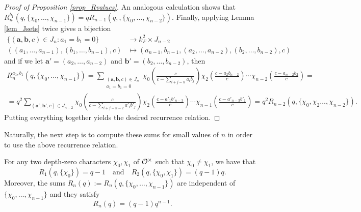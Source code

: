 \begin{proof}[Proof of Proposition \ref{prop_Rvalues}]
        An analogous calculation shows that $R_n^{b_1}(q,\{\chi_0,\ldots,\chi_{n-1}\})=qR_{n-1}(q,,\{\chi_0,\ldots,\chi_{n-2}\})$. Finally, applying Lemma \ref{lem_Jsets} twice gives a bijection 
        \begin{align*}
            \{(\mathbf{a},\mathbf{b},c)\in J_n:a_1=b_1=0\}&\longrightarrow k_F^2\times J_{n-2}\\
            ((a_1,\ldots,a_{n-1}),(b_1,\ldots,b_{n-1}),c)&\longmapsto (a_{n-1},b_{n-1},(a_2,\ldots,a_{n-2}),(b_2,\ldots,b_{n-2}),c)
        \end{align*}
        and if we let $\mathbf{a}'=(a_2,\ldots,a_{n-2})$ and $\mathbf{b}'=(b_2,\ldots,b_{n-2})$, then
        \begin{align*}
            R_n^{a_1,b_1}(q,\{\chi_0,\ldots,\chi_{n-1}\})=\sum_{\substack{(\mathbf{a},\mathbf{b},c)\in J_n\\ a_1=b_1=0}}\chi_0\left(\frac{c}{c-\sum_{i+j=n}a_ib_j}\right)\chi_2\left(\frac{c-a_2b_{n-2}}{c}\right)%
            \cdots\chi_{n-2}\left(\frac{c-a_{n-2}b_2}{c}\right)=\\
            =q^2\sum_{(\mathbf{a}',\mathbf{b}',c)\in J_{n-2}}\chi_0\left(\frac{c}{c-\sum_{i+j=n-2}a'_ib'_j}\right)\chi_2\left(\frac{c-a'_1b'_{n-3}}{c}\right)%
            \cdots\chi_{n-1}\left(\frac{c-a'_{n-3}b'_1}{c}\right)=q^2R_{n-2}(q,\{\chi_0,\chi_2\ldots,\chi_{n-2}\}).
        \end{align*}
        Putting everything together yields the desired recurrence relation.
    \end{proof}

    Naturally, the next step is to compute these sums for small values of $n$ in order to use the above recurrence relation.

    \begin{proposition}
        For any two depth-zero characters $\chi_0,\chi_1$ of $\mathcal{O}^\times$ such that $\chi_0\neq\chi_1$, we have that 
        \begin{equation}\label{eqn_Rinitial}
            R_1(q,\{\chi_0\})=q-1\quad\text{and}\quad R_2(q,\{\chi_0,\chi_1\})=(q-1)q.
        \end{equation}
        Moreover, the sums $R_n(q):=R_n(q,\{\chi_0,\ldots,\chi_{n-1}\})$ are independent of $\{\chi_0,\ldots,\chi_{n-1}\}$ and they satisfy $$R_n(q)=(q-1)q^{n-1}.$$
    \end{proposition}

